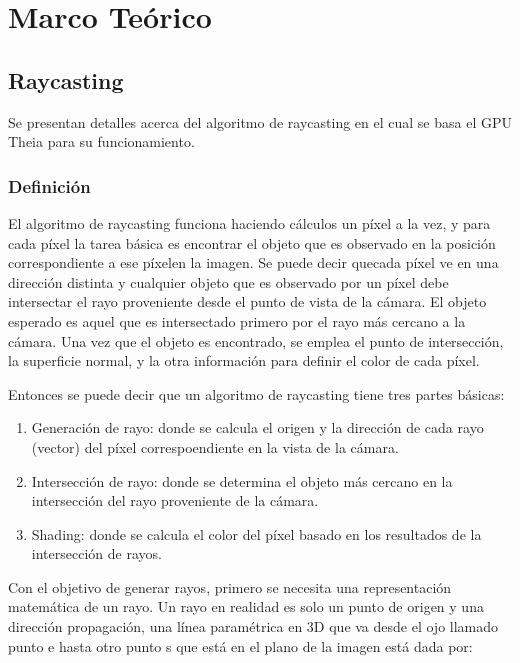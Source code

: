 \chapter{Marco Teórico}%

\section{Raycasting}

Se presentan detalles acerca del algoritmo de raycasting en el cual se basa el GPU Theia para su funcionamiento.

\subsection{Definición}

El algoritmo de raycasting funciona haciendo cálculos un píxel a la vez, y para cada píxel la tarea básica es encontrar el objeto que es observado en la posición correspondiente a ese píxelen la imagen. Se puede decir quecada píxel ve en una dirección distinta y cualquier objeto que es observado por un píxel debe intersectar el rayo proveniente desde el punto de vista de la cámara. El objeto esperado es aquel que es intersectado primero por el rayo más cercano a la cámara. Una vez que el objeto es encontrado, se emplea el punto de intersección, la superficie normal, y la otra información para definir el color de cada píxel. 

Entonces se puede decir que un algoritmo de raycasting tiene tres partes básicas:

\begin{enumerate}

\item Generación de rayo: donde se calcula el origen y la dirección de cada rayo (vector) del píxel correspoendiente en la vista de la cámara.
\item Intersección de rayo: donde se determina el objeto más cercano en la intersección del rayo proveniente de la cámara.
\item Shading: donde se calcula el color del píxel basado en los resultados de la intersección de rayos.

\end{enumerate}

Con el objetivo de generar rayos, primero se necesita una representación matemática de un rayo. Un rayo en realidad es solo un punto de origen y una dirección propagación, una línea paramétrica en 3D que va desde el ojo llamado punto e hasta otro punto s que está en el plano de la imagen está dada por: 

